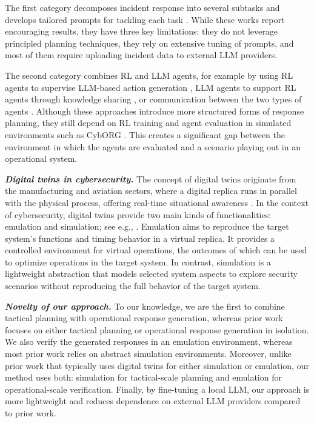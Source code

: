 \documentclass[sigconf]{acmart}
\begin{document}
The first category decomposes incident response into several subtasks and develops tailored prompts for tackling each task \cite{hamoun25llm-acd, guo25ircopilot, tao25deception}. While these works report encouraging results, they have three key limitations: they do not leverage principled planning techniques, they rely on extensive tuning of prompts, and most of them require uploading incident data to external LLM providers.

The second category combines RL and LLM agents, for example by using RL agents to supervise LLM-based action generation \cite{keman24rl-mentor}, LLM agents to support RL agents through knowledge sharing \cite{lopes24hybrid-ai}, or communication between the two types of agents \cite{cardenas25llm4acd}. Although these approaches introduce more structured forms of response planning, they still depend on RL training and agent evaluation in simulated environments such as CybORG \cite{cyborg_acd_2021}. This creates a significant gap between the environment in which the agents are evaluated and a scenario playing out in an operational system.

\vspace{2.5mm}
\noindent\textit{\textbf{Digital twins in cybersecurity.}}
The concept of digital twins originate from the manufacturing and aviation sectors, where a digital replica runs in parallel with the physical process, offering real-time situational awareness \cite{grieves2016digital}. In the context of cybersecurity, digital twins provide two main kinds of functionalities: emulation and simulation; see e.g., \cite{dietz21dt-forensics,weippl19dt-aware,maclaughlin22dt-ml,pernul20dt,colomo20dt-survery,repetto26cdt,pernul20dt-soc}. Emulation aims to reproduce the target system’s functions and timing behavior in a virtual replica. It provides a controlled environment for virtual operations, the outcomes of which can be used to optimize operations in the target system. In contrast, simulation is a lightweight abstraction that models selected system aspects to explore security scenarios without reproducing the full behavior of the target system.

\vspace{2.5mm}
\noindent\textit{\textbf{Novelty of our approach.}} To our knowledge, we are the first to combine tactical planning with operational response generation, whereas prior work focuses on either tactical planning or operational response generation in isolation. We also verify the generated responses in an emulation environment, whereas most prior work relies on abstract simulation environments. Moreover, unlike prior work that typically uses digital twins for either simulation or emulation, our method uses both: simulation for tactical-scale planning and emulation for operational-scale verification. Finally, by fine-tuning a local LLM, our approach is more lightweight and reduces dependence on external LLM providers compared to prior work.
\end{document}
